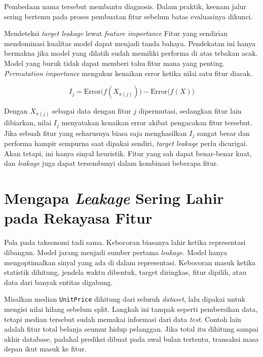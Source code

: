 Pembedaan nama tersebut membantu diagnosis. Dalam praktik, keenam jalur sering bertemu pada proses pembuatan fitur sebelum batas evaluasinya dikunci.

\begin{pendalaman}{Mendeteksi \emph{target leakage} lewat \emph{feature importance}}
Fitur yang sendirian mendominasi kualitas model dapat menjadi tanda bahaya. Pendekatan ini hanya bermakna jika model yang dilatih sudah memiliki performa di atas tebakan acak. Model yang buruk tidak dapat memberi tahu fitur mana yang penting. \emph{Permutation importance} mengukur kenaikan error ketika nilai satu fitur diacak.
\end{pendalaman}

\[
I_j = \text{Error}\big(f(X_{\pi(j)})\big) - \text{Error}\big(f(X)\big)
\]

Dengan \(X_{\pi(j)}\) sebagai data dengan fitur \(j\) dipermutasi, sedangkan fitur lain dibiarkan, nilai \(I_j\) menyatakan kenaikan error akibat pengacakan fitur tersebut. Jika sebuah fitur yang seharusnya biasa saja menghasilkan \(I_j\) sangat besar dan performa hampir sempurna saat dipakai sendiri, \emph{target leakage} perlu dicurigai. Akan tetapi, ini hanya sinyal heuristik. Fitur yang sah dapat benar-benar kuat, dan \emph{leakage} juga dapat tersembunyi dalam kombinasi beberapa fitur.

\section{\texorpdfstring{Mengapa \emph{Leakage} Sering Lahir pada Rekayasa Fitur}{Mengapa Leakage Sering Lahir pada Rekayasa Fitur}}\label{mengapa-leakage-sering-lahir-pada-rekayasa-fitur}

Pola pada taksonomi tadi sama. Kebocoran biasanya lahir ketika representasi dibangun. Model jarang menjadi sumber pertama \emph{leakage}. Model hanya mengoptimalkan sinyal yang ada di dalam representasi. Kebocoran masuk ketika statistik dihitung, jendela waktu dibentuk, target diringkas, fitur dipilih, atau data dari banyak entitas digabung.

Misalkan median \passthrough{\lstinline!UnitPrice!} dihitung dari seluruh \emph{dataset}, lalu dipakai untuk mengisi nilai hilang sebelum split. Langkah ini tampak seperti pembersihan data, tetapi median tersebut sudah memakai informasi dari data \emph{test}. Contoh lain adalah fitur total belanja seumur hidup pelanggan. Jika total itu dihitung sampai akhir database, padahal prediksi dibuat pada awal bulan tertentu, transaksi masa depan ikut masuk ke fitur.

